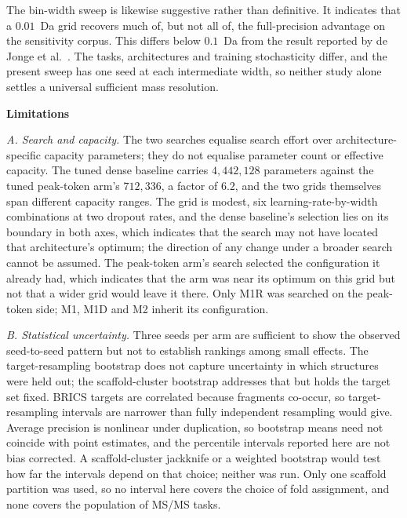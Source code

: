 \documentclass[11pt]{article}
\newcommand{\hd}[1]{\medskip\par\noindent\textbf{#1}\par\nobreak\vspace{2pt}\noindent\ignorespaces}
\begin{document}
The bin-width sweep is likewise suggestive rather than definitive. It indicates that a $0.01$~Da grid recovers much of, but not all of, the full-precision advantage on the sensitivity corpus. This differs below $0.1$~Da from the result reported by de Jonge et al.\ \cite{dejonge2026cross}. The tasks, architectures and training stochasticity differ, and the present sweep has one seed at each intermediate width, so neither study alone settles a universal sufficient mass resolution.

\hd{Limitations}
\emph{A. Search and capacity.} The two searches equalise search effort over
architecture-specific capacity parameters; they do not equalise parameter count or
effective capacity. The tuned dense baseline carries $4{,}442{,}128$ parameters
against the tuned peak-token arm's $712{,}336$, a factor of $6.2$, and the two grids
themselves span different capacity ranges. The grid is modest, six
learning-rate-by-width combinations at two dropout rates, and the dense baseline's
selection lies on its boundary in both axes, which indicates that the search may not
have located that architecture's optimum; the direction of any change under a broader
search cannot be assumed. The peak-token arm's search selected the configuration it
already had, which indicates that the arm was near its optimum on this grid but not
that a wider grid would leave it there. Only M1R was searched on the peak-token side;
M1, M1D and M2 inherit its configuration.

\emph{B. Statistical uncertainty.} Three seeds per arm are sufficient to show the
observed seed-to-seed pattern but not to establish rankings among small effects. The
target-resampling bootstrap does not capture uncertainty in which structures were
held out; the scaffold-cluster bootstrap addresses that but holds the target set
fixed. BRICS targets are correlated because fragments co-occur, so target-resampling
intervals are narrower than fully independent resampling would give. Average
precision is nonlinear under duplication, so bootstrap means need not coincide with
point estimates, and the percentile intervals reported here are not bias corrected. A
scaffold-cluster jackknife or a weighted bootstrap would test how far the intervals
depend on that choice; neither was run. Only one scaffold partition was used, so no
interval here covers the choice of fold assignment, and none covers the population of
MS/MS tasks.
\end{document}

